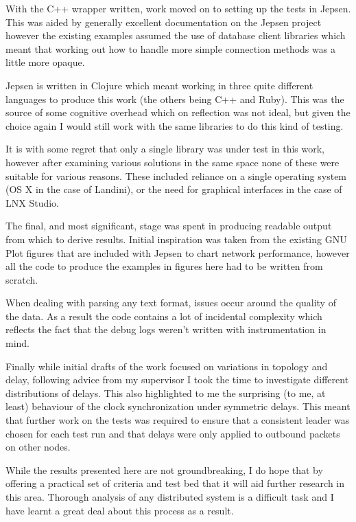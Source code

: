 \documentclass[11pt]{article} %
\theoremstyle{plain}
\theoremstyle{definition}
\begin{document}
With the C++ wrapper written, work moved on to setting up the tests in Jepsen.
This was aided by generally excellent documentation on the Jepsen project
however the existing examples assumed the use of database client libraries
which meant that working out how to handle more simple connection methods was a
little more opaque.

Jepsen is written in Clojure which meant working in three quite different
languages to produce this work (the others being C++ and Ruby). This was the
source of some cognitive overhead which on reflection was not ideal, but given
the choice again I would still work with the same libraries to do this kind of
testing.

It is with some regret that only a single library was under test in this work,
however after examining various solutions in the same space none of these were
suitable for various reasons. These included reliance on a single operating
system (OS X in the case of Landini\cite{narveson2013landini}), or the need for
graphical interfaces in the case of LNX Studio\cite{lnxstudio}.

The final, and most significant, stage was spent in producing readable output
from which to derive results. Initial inspiration was taken from the existing
GNU Plot figures that are included with Jepsen to chart network performance,
however all the code to produce the examples in figures here had to be written
from scratch.

When dealing with parsing any text format, issues occur around the quality of
the data. As a result the code contains a lot of incidental complexity which
reflects the fact that the debug logs weren't written with instrumentation in
mind.

Finally while initial drafts of the work focused on variations in topology and
delay, following advice from my supervisor I took the time to investigate
different distributions of delays. This also highlighted to me the surprising
(to me, at least) behaviour of the clock synchronization under symmetric
delays. This meant that further work on the tests was required to ensure that a
consistent leader was chosen for each test run and that delays were only
applied to outbound packets on other nodes.

While the results presented here are not groundbreaking, I do hope that by
offering a practical set of criteria and test bed that it will aid further
research in this area. Thorough analysis of any distributed system is a
difficult task and I have learnt a great deal about this process as a result.
\end{document}
